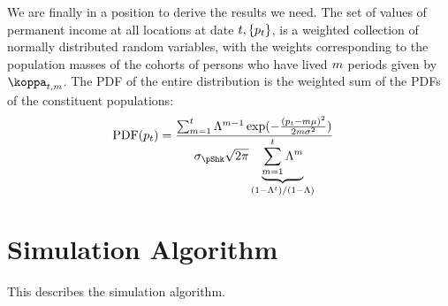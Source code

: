 \documentclass[../BufferStockTheory.tex]{subfiles}\usepackage{ApndxSteadyState}
\begin{document}
  We are finally in a position to derive the results we need.
  The set of values of permanent income at all locations at date $t,\{p_{t}\}$, is a weighted collection of normally distributed random variables, with the weights corresponding to the population masses of the cohorts of persons who have lived $m$ periods given by $\wgt_{\FutPer,\LooPer}$.  The PDF of the entire distribution is the weighted sum of the PDFs of the constituent populations:
  \begin{align}
    \PDF(\pLog_{\FutPer}) & = \frac{\sum _{\LooPer=1}^{\FutPer}
                            \Liv^{\LooPer-1}
                            \exp({-\frac{(\pLog_{\FutPer}-\LooPer \pShkMean )^2}{2
                            \LooPer \sigma ^2}})}{
                            \sigma_{\pShk} \sqrt{2 \pi }
                            \underbrace{
                            \sum_{\LooPer=1}^{\FutPer}\Liv^{\LooPer}
                            }_{\left(1-\Liv^{\FutPer}\right)/(1-\Liv)}
                            }
  \end{align}
  \section{Simulation Algorithm}
  This describes the simulation algorithm.
\end{document}
